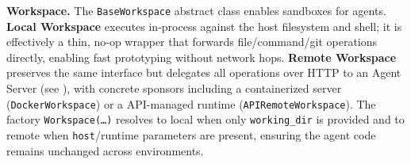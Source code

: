 \textbf{Workspace.}
\label{sec:workspace}
The \texttt{BaseWorkspace} abstract class enables sandboxes for agents.
\textbf{Local Workspace} executes in-process against the host filesystem and shell; it is effectively a thin, no-op wrapper that forwards file/command/git operations directly, enabling fast prototyping without network hops. 
\textbf{Remote Workspace} preserves the same interface but delegates all operations over HTTP to an Agent Server (see ), with concrete sponsors including a containerized server (\texttt{DockerWorkspace}) or a API-managed runtime (\texttt{APIRemoteWorkspace}). The factory \texttt{Workspace(\ldots)} resolves to local when only \texttt{working\_dir} is provided and to remote when \texttt{host}/runtime parameters are present, ensuring the agent code remains unchanged across environments.

